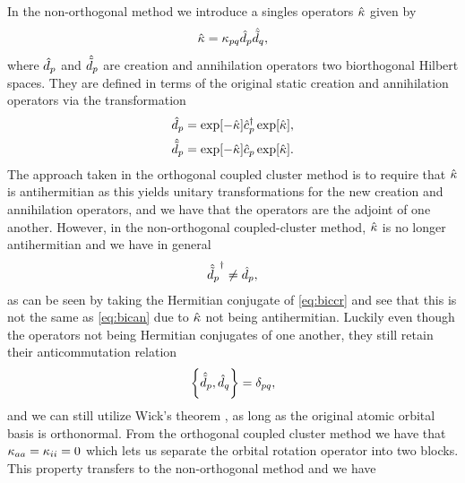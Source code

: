             In the non-orthogonal method we introduce a singles operators
            $\hat{\kappa}$ given by
            \begin{align}
                \hat{\kappa} = \kappa_{pq}\hat{d}_{p}\hat{\tilde{d}}_{q},
            \end{align}
            where $\hat{d}_{p}$ and $\hat{\tilde{d}}_{p}$ are creation and annihilation
            operators two biorthogonal Hilbert spaces.
            They are defined in terms of the original static creation and
            annihilation operators via the transformation
            \cite{helgaker-molecular, rolf-nocc}
            \begin{gather}
                \hat{d}_{p}
                = \exp[-\hat{\kappa}]\hat{c}_{p}^{\dagger}\exp[\hat{\kappa}],
                \label{eq:biccr}
                \\
                \hat{\tilde{d}}_{p}
                = \exp[-\hat{\kappa}]\hat{c}_{p}\exp[\hat{\kappa}].
                \label{eq:bican}
            \end{gather}
            The approach taken in the orthogonal coupled cluster method is to
            require that $\hat{\kappa}$ is antihermitian as this yields unitary
            transformations for the new creation and annihilation operators, and
            we have that the operators are the adjoint of one another.
            However, in the non-orthogonal coupled-cluster method, $\hat{\kappa}$ is no
            longer antihermitian and we have in general
            \begin{align}
                {\hat{\tilde{d}}_{p}}^{\dagger} \neq \hat{d}_{p},
            \end{align}
            as can be seen by taking the Hermitian conjugate of
            \autoref{eq:biccr} and see that this is not the same as
            \autoref{eq:bican} due to $\hat{\kappa}$ not being antihermitian.
            Luckily even though the operators not being Hermitian conjugates of
            one another, they still retain their anticommutation relation
            \cite{balian1969, lowdin-bi}
            \begin{align}
                \left\{\hat{\tilde{d}}_{p}, \hat{d}_{q}\right\} = \delta_{pq},
            \end{align}
            and we can still utilize Wick's theorem \cite{rolf-nocc,
            kvaal2012ab}, as long as the original atomic orbital basis is
            orthonormal.
            From the orthogonal coupled cluster method we have that
            $\kappa_{aa} = \kappa_{ii} = 0$ which lets us separate the
            orbital rotation operator into two blocks.
            This property transfers to the non-orthogonal method and we have
